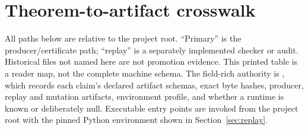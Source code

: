 \documentclass[11pt]{article}
\theoremstyle{remark}
\begin{document}
\section{Theorem-to-artifact crosswalk}\label{sec:crosswalk}

All paths below are relative to the
 project root.  ``Primary'' is the
producer/certificate path; ``replay'' is a separately implemented checker or
audit.  Historical files not named here are not promotion evidence.  This
printed table is a reader map, not the complete machine schema.  The
field-rich authority is
,
which records each claim's declared artifact schemas, exact byte hashes,
producer, replay and mutation artifacts, environment profile, and whether a
runtime is known or deliberately null.  Executable entry points are invoked
from the project root with the pinned Python environment shown in
Section~\ref{sec:replay}.
\end{document}
